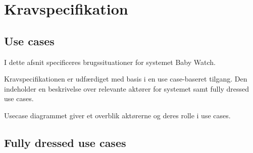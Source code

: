 \chapter{Kravspecifikation}


\newpage
\section{Use cases}

I dette afsnit specificeres brugssituationer for systemet Baby Watch.

Kravspecifikationen er udfærdiget med basis i en use case-baseret tilgang. Den indeholder en beskrivelse over relevante aktører for systemet samt fully dressed use cases.


Usecase diagrammet giver et overblik aktørerne og deres rolle i use cases.


\newpage
\section{Fully dressed use cases}

\newpage

\newpage

\newpage



